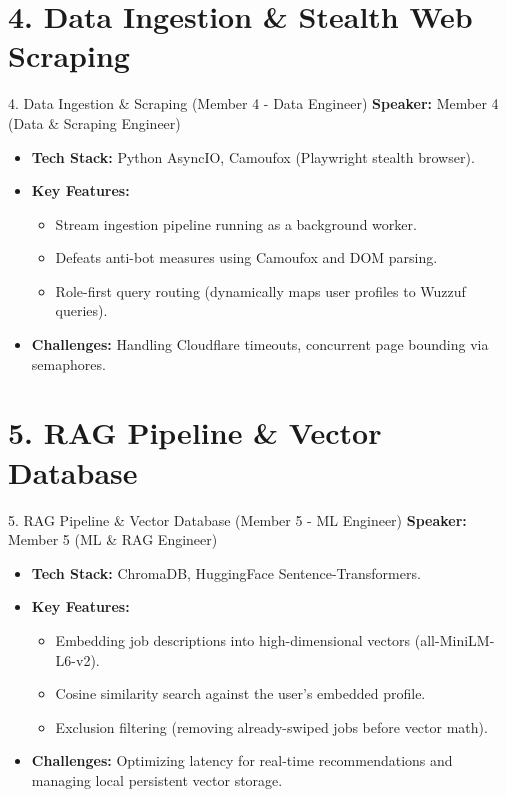 \documentclass[aspectratio=169]{beamer}
\begin{document}
\section{4. Data Ingestion \& Stealth Web Scraping}
\begin{frame}{4. Data Ingestion \& Scraping (Member 4 - Data Engineer)}
    \textbf{Speaker:} Member 4 (Data \& Scraping Engineer)
    \vspace{0.5cm}
    \begin{itemize}
        \item \textbf{Tech Stack:} Python AsyncIO, Camoufox (Playwright stealth browser).
        \item \textbf{Key Features:}
        \begin{itemize}
            \item Stream ingestion pipeline running as a background worker.
            \item Defeats anti-bot measures using Camoufox and DOM parsing.
            \item Role-first query routing (dynamically maps user profiles to Wuzzuf queries).
        \end{itemize}
        \item \textbf{Challenges:} Handling Cloudflare timeouts, concurrent page bounding via semaphores.
    \end{itemize}
\end{frame}

\section{5. RAG Pipeline \& Vector Database}
\begin{frame}{5. RAG Pipeline \& Vector Database (Member 5 - ML Engineer)}
    \textbf{Speaker:} Member 5 (ML \& RAG Engineer)
    \vspace{0.5cm}
    \begin{itemize}
        \item \textbf{Tech Stack:} ChromaDB, HuggingFace Sentence-Transformers.
        \item \textbf{Key Features:}
        \begin{itemize}
            \item Embedding job descriptions into high-dimensional vectors (all-MiniLM-L6-v2).
            \item Cosine similarity search against the user's embedded profile.
            \item Exclusion filtering (removing already-swiped jobs before vector math).
        \end{itemize}
        \item \textbf{Challenges:} Optimizing latency for real-time recommendations and managing local persistent vector storage.
    \end{itemize}
\end{frame}
\end{document}
